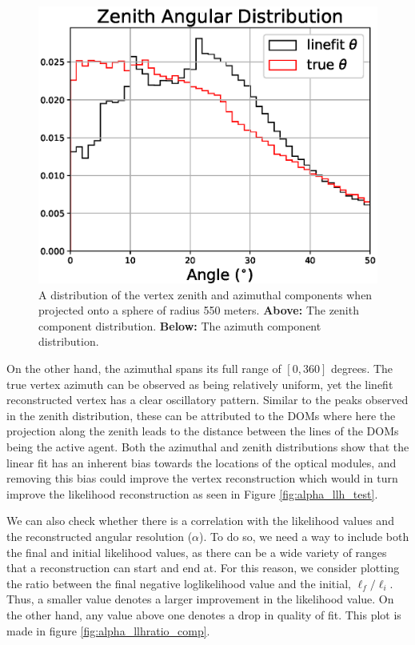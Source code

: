 \begin{figure}[H]
  \centering
  \includegraphics[width=12cm]{./Figures/reco_plots/zenith_vert_dist_modified_zoomed.eps}
  \caption{A distribution of the vertex zenith and azimuthal components when projected onto a sphere of radius 550 meters. \textbf{Above:} The zenith component distribution. \textbf{Below:} The azimuth component distribution.}
  \label{fig:vert_dist_zoomed}
\end{figure}

On the other hand, the azimuthal spans its full range of $[0, 360]$ degrees. The true vertex azimuth can be observed as being relatively uniform, yet the linefit reconstructed vertex has a clear oscillatory pattern. Similar to the peaks observed in the zenith distribution, these can be attributed to the DOMs where here the projection along the zenith leads to the distance between the lines of the DOMs being the active agent. Both the azimuthal and zenith distributions show that the linear fit has an inherent bias towards the locations of the optical modules, and removing this bias could improve the vertex reconstruction which would in turn improve the likelihood reconstruction as seen in Figure \ref{fig:alpha_llh_test}. 

We can also check whether there is a correlation with the likelihood values and the reconstructed angular resolution ($\alpha$). To do so, we need a way to include both the final and initial likelihood values, as there can be a wide variety of ranges that a reconstruction can start and end at. For this reason, we consider plotting the ratio between the final negative loglikelihood value and the initial, $\ell_{f}/\ell_{i}$. Thus, a smaller value denotes a larger improvement in the likelihood value. On the other hand, any value above one denotes a drop in quality of fit. This plot is made in figure \ref{fig:alpha_llhratio_comp}.

